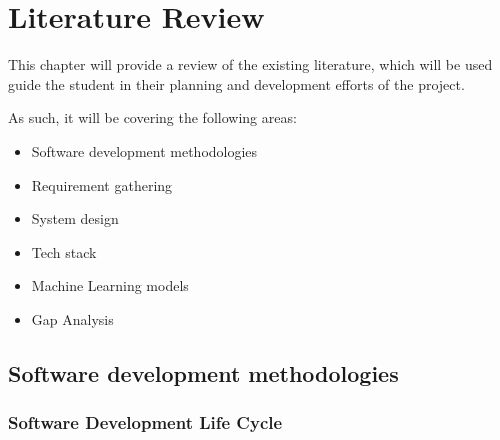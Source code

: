 \chapter{Literature Review}

This chapter will provide a review of the existing literature, which will be used guide the student in their planning and development efforts of the project.

\noindent As such, it will be covering the following areas:
\begin{itemize}
    \item Software development methodologies
    \item Requirement gathering
    \item System design
    \item Tech stack
    \item Machine Learning models
    \item Gap Analysis
\end{itemize}

\section{Software development methodologies}

\subsection{Software Development Life Cycle}

